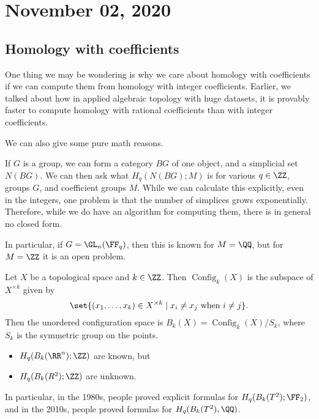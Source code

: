 \documentclass{standalone}
\begin{document}
\chapter{November 02, 2020}

\section{Homology with coefficients}
One thing we may be wondering is why we care about homology with coefficients
if we can compute them from homology with integer coefficients.
Earlier, we talked about how in applied algebraic topology with huge datasets,
it is provably faster to compute homology with rational coefficients than
with integer coefficients.

We can also give some pure math reasons.
\begin{example}
  If \(G\) is a group, we can form
    a category \(BG\) of one object, and
    a simplicial set \(N(BG)\).
  We can then ask what \(H_q(N(BG); M)\) is for various
  \(q \in \ZZ\), groups \(G\), and coefficient groups \(M\).
  While we can calculate this explicitly, even in the integers,
  one problem is that the number of simplices grows exponentially.
  Therefore, while we do have an algorithm for computing them,
  there is in general no closed form.

  In particular, if \(G = \GL_n(\FF_q)\),
  then this is known for \(M = \QQ\),
  but for \(M = \ZZ\) it is an open problem.
\end{example}

\begin{example}
  Let \(X\) be a topological space and \(k \in \ZZ\).
  Then \(\operatorname{Config}_k(X)\) is the subspace of \(X^{\times k}\)
  given by
  \[
    \set{(x_1, \dots, x_k) \in X^{\times k} \mid
      \text{\(x_i \neq x_j\) when \(i \neq j\)}
    }.
  \]
  Then the unordered configuration space is
  \(B_k(X) = \operatorname{Config}_k(X) / S_k\),
  where \(S_k\) is the symmetric group on the points.
  \begin{itemize}[nosep]
    \item \(H_q(B_k(\RR^n); \ZZ)\) are known, but
    \item \(H_q(B_k(R^2); \ZZ)\) are unknown.
  \end{itemize}
  In particular, in the 1980s,
  people proved explicit formulas for \(H_q(B_k(T^2); \FF_2)\),
  and in the 2010s, people proved formulas for \(H_q(B_k(T^2), \QQ)\).
\end{example}
\end{document}
